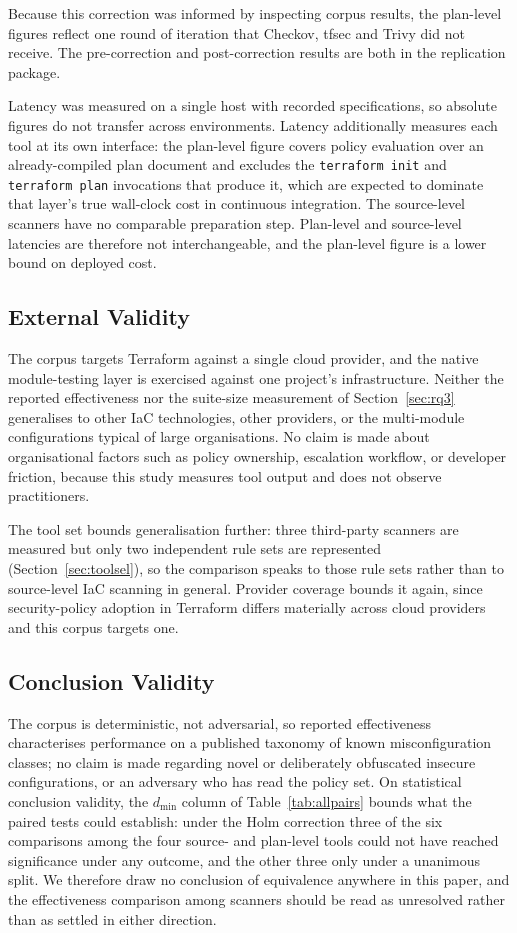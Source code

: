 \documentclass[smallextended]{svjour3}
\begin{document}
Because this correction was informed by inspecting corpus results, the plan-level
figures reflect one round of iteration that Checkov, tfsec and Trivy did not
receive. The pre-correction and post-correction results are both in the
replication package.

Latency was measured on a single host with recorded specifications, so absolute
figures do not transfer across environments. Latency additionally measures each
tool at its own interface: the plan-level figure covers policy evaluation over an
already-compiled plan document and excludes the \texttt{terraform init} and
\texttt{terraform plan} invocations that produce it, which are expected to
dominate that layer's true wall-clock cost in continuous integration. The source-level scanners have no
comparable preparation step. Plan-level and source-level latencies are therefore
not interchangeable, and the plan-level figure is a lower bound on deployed cost.

\subsection{External Validity}
The corpus targets Terraform against a single cloud provider, and the native
module-testing layer is exercised against one project's infrastructure. Neither
the reported effectiveness nor the suite-size measurement of
Section~\ref{sec:rq3} generalises to other IaC technologies, other providers, or
the multi-module configurations typical of large organisations. No claim is made
about organisational factors such as policy ownership, escalation workflow, or
developer friction, because this study measures tool output and does not observe
practitioners.

The tool set bounds generalisation further: three third-party scanners are
measured but only two independent rule sets are represented
(Section~\ref{sec:toolsel}), so the comparison speaks to those rule sets rather
than to source-level IaC scanning in general. Provider coverage bounds it again,
since security-policy adoption in Terraform differs materially across cloud
providers \citep{verdet2025adoption} and this corpus targets one.

\subsection{Conclusion Validity}
The corpus is deterministic, not adversarial, so reported effectiveness
characterises performance on a published taxonomy of known misconfiguration
classes; no claim is made regarding novel or deliberately obfuscated insecure
configurations, or an adversary who has read the policy set. On statistical
conclusion validity, the $d_{\min}$ column of Table~\ref{tab:allpairs} bounds
what the paired tests could establish: under the Holm correction three of the six
comparisons among the four source- and plan-level tools could not have reached
significance under any outcome, and the other three only under a unanimous split. We therefore draw no conclusion of
equivalence anywhere in this paper, and the effectiveness comparison among
scanners should be read as unresolved rather than as settled in either direction.
\end{document}
